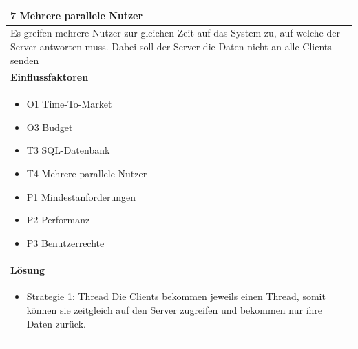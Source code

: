 \documentclass[fontsize=12pt,paper=a4,twoside]{scrartcl}
\begin{document}
\begin{table}[H]
\begin{tabular}{|p{\textwidth}|}\hline
7 Mehrere parallele Nutzer\\ \hline
Es greifen mehrere Nutzer zur gleichen Zeit auf das System zu, auf welche der Server antworten muss. Dabei soll der Server die Daten nicht an alle Clients senden\\ \hline
\textbf{Einflussfaktoren}\\
\begin{itemize}
\item O1 Time-To-Market
\item O3 Budget
\item T3 SQL-Datenbank
\item T4 Mehrere parallele Nutzer
\item P1 Mindestanforderungen
\item P2 Performanz
\item P3 Benutzerrechte
\end{itemize}\\ \hline
\textbf{Lösung}\\
\begin{itemize}
\item Strategie 1: Thread \leavevmode\newline
Die Clients bekommen jeweils einen Thread, somit können sie zeitgleich auf den Server zugreifen und bekommen nur ihre Daten zurück.
\end{itemize}\\ \hline
\end{tabular}
\end{table}
\end{document}
